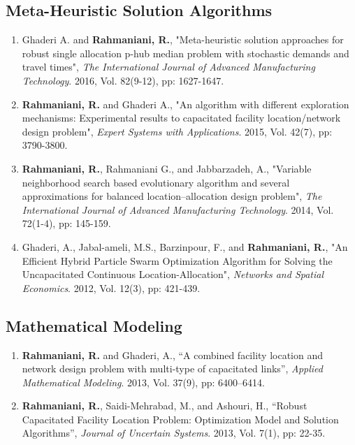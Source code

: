 \documentclass[10PT,letter]{article}
\newcommand{\subsectionstyle}[1]{\normalfont\selectfont\textcolor{titlecol}{\sffamily #1}}
\begin{document}
		\subsection*{\subsectionstyle{Meta-Heuristic  Solution Algorithms}}
			\begin{enumerate}[itemsep=.5mm]
				\item 
							Ghaderi A. and \textbf{Rahmaniani, R.}, "Meta-heuristic solution approaches for robust single allocation p-hub median problem with stochastic demands and travel times", \textit{The International Journal of Advanced Manufacturing Technology}. 2016, Vol. 82(9-12), pp: 1627-1647.
				\item 
							\textbf{Rahmaniani, R.} and Ghaderi A., "An algorithm with different exploration mechanisms: Experimental results to capacitated facility location/network design problem", \textit{Expert Systems with Applications}. 2015, Vol. 42(7), pp: 3790-3800.
				\item
							 \textbf{Rahmaniani, R.}, Rahmaniani G., and Jabbarzadeh, A., "Variable neighborhood search based evolutionary algorithm and several approximations for balanced location–allocation design problem", \textit{The International Journal of Advanced Manufacturing Technology}. 2014, Vol. 72(1-4), pp: 145-159.
				\item 
							Ghaderi, A., Jabal-ameli, M.S., Barzinpour, F., and \textbf{Rahmaniani, R.}, "An Efficient Hybrid Particle Swarm Optimization Algorithm for Solving the Uncapacitated Continuous Location-Allocation", \textit{Networks and Spatial Economics}. 2012, Vol. 12(3), pp: 421-439.
			\end{enumerate}
		\subsection*{\subsectionstyle{Mathematical Modeling}}
			\begin{enumerate}[itemsep=.5mm]
           		 \item 
           		 			\textbf{Rahmaniani, R.} and Ghaderi, A., “A combined facility location and network design problem with multi-type of capacitated links”, \textit{Applied Mathematical Modeling}. 2013, Vol. 37(9), pp: 6400–6414.	
           		 \item
           		 			\textbf{Rahmaniani, R.}, Saidi-Mehrabad, M., and Ashouri, H., “Robust Capacitated Facility Location Problem: Optimization Model and Solution Algorithms”, \textit{Journal of Uncertain Systems}. 2013, Vol. 7(1), pp: 22-35.
       		 \end{enumerate}
\end{document}
